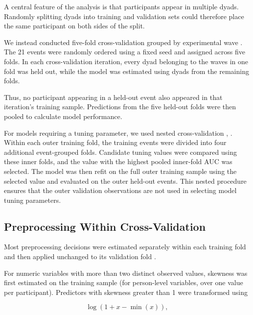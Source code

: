 A central feature of the analysis is that participants appear in multiple dyads. Randomly splitting dyads into training and validation sets could therefore place the same participant on both sides of the split.

We instead conducted five-fold cross-validation grouped by experimental wave \cite[pp.~917, 919]{Roberts:2017}. The 21 events were randomly ordered using a fixed seed and assigned across five folds. In each cross-validation iteration, every dyad belonging to the waves in one fold was held out, while the model was estimated using dyads from the remaining folds.

Thus, no participant appearing in a held-out event also appeared in that iteration's training sample. Predictions from the five held-out folds were then pooled to calculate model performance.

For models requiring a tuning parameter, we used nested cross-validation \cite{Varma:2006}, \cite[Section 7.10.2, pp.~245--247]{Hastie:2009}. Within each outer training fold, the training events were divided into four additional event-grouped folds. Candidate tuning values were compared using these inner folds, and the value with the highest pooled inner-fold AUC was selected. The model was then refit on the full outer training sample using the selected value and evaluated on the outer held-out events. This nested procedure ensures that the outer validation observations are not used in selecting model tuning parameters.

\subsection{Preprocessing Within Cross-Validation}

Most preprocessing decisions were estimated separately within each training fold and then applied unchanged to its validation fold \cite[Section 7.10.2, pp.~245--247]{Hastie:2009}.

For numeric variables with more than two distinct observed values, skewness was first estimated on the training sample (for person-level variables, over one value per participant). Predictors with skewness greater than 1 were transformed using

\begin{equation}
\log(1+x-\min(x)),
\end{equation}

